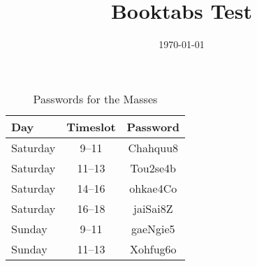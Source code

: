 \documentclass[a4paper,final,12pt]{article}
\title{Booktabs Test}
\date{\today}
\begin{document}
\maketitle


\begin{table}[h]
  \centering
  \begin{tabular}{lcc}
    \toprule
      Day & Timeslot & Password \\
    \midrule
      Saturday & 9--11 & Chahquu8 \\
      Saturday & 11--13 & Tou2se4b \\
      Saturday & 14--16 & ohkae4Co \\
      Saturday & 16--18 & jaiSai8Z \\
      Sunday & 9--11 & gaeNgie5 \\
      Sunday & 11--13 & Xohfug6o \\
    \bottomrule
  \end{tabular}
  \caption{Passwords for the Masses}
\end{table}
\end{document}
